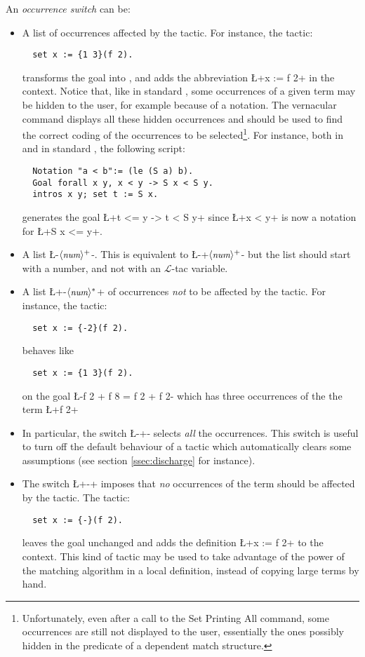 An \emph{occurrence switch} can be:
\begin{itemize}
\item A list  of occurrences affected by the
  tactic. 
For instance, the tactic:
\begin{lstlisting}
  set x := {1 3}(f 2).
\end{lstlisting}
transforms the goal  into
, and adds the abbreviation
\L+x := f 2+ in the
context. Notice that, like in standard \Coq{},
 some occurrences of a
given term may be hidden to the user, for example because of a
notation. The vernacular  command displays all
these hidden occurrences and should be used to find the correct
coding of the occurrences to be selected\footnote{Unfortunately,
even after a call to the Set Printing All command, some occurrences are
still not displayed to the user, essentially the ones possibly hidden
in the predicate of a dependent match structure.}. For instance, both
in \ssr{} and in standard \Coq{}, the following script:
\begin{lstlisting}
  Notation "a < b":= (le (S a) b).
  Goal forall x y, x < y -> S x < S y.
  intros x y; set t := S x.
\end{lstlisting}
generates the goal
\L+t <= y -> t < S y+ since \L+x < y+ is now a notation for 
\L+S x <= y+.
\item A list \L-{$\langle\mbox{\itshape\rmfamily\small num}\rangle^+$}-. This is equivalent to
    \L-{+$\langle\mbox{\itshape\rmfamily\small num}\rangle^+$}- but the list should start with a number, and
  not with an $\mathcal{L}$-tac variable.
\item A list \L+{-$\langle\mbox{\itshape\rmfamily\small num}\rangle^*$}+ of occurrences \emph{not} to be
  affected by the tactic. For instance, the tactic:
\begin{lstlisting}
  set x := {-2}(f 2).
\end{lstlisting}
behaves like
\begin{lstlisting}
  set x := {1 3}(f 2).
\end{lstlisting}
on the goal \L-f 2 + f 8 = f 2 + f 2- which has three occurrences of
the the term \L+f 2+
\item In particular, the switch \L-{+}- selects \emph{all} the
  occurrences. This switch is useful to turn
  off the default behaviour of a tactic which automatically clears 
  some assumptions (see section \ref{ssec:discharge} for instance).
\item The switch \L+{-}+ imposes that \emph{no} occurrences of the
  term should be affected by the tactic. The tactic:
\begin{lstlisting}
  set x := {-}(f 2).
\end{lstlisting}
leaves the goal unchanged and adds the definition \L+x := f 2+ to the
context. This kind of tactic may be used to take advantage of the
power of the matching algorithm in a local definition, instead of
copying large terms by hand.
\end{itemize}


